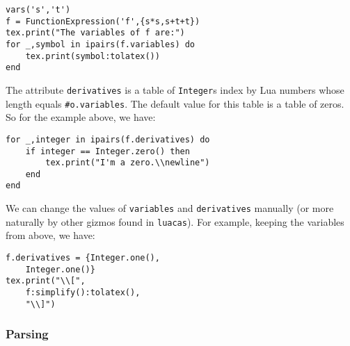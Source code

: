 \documentclass{article}
\begin{document}
\begin{codebox}
    \begin{verbatim}
vars('s','t')
f = FunctionExpression('f',{s*s,s+t+t})
tex.print("The variables of f are:")
for _,symbol in ipairs(f.variables) do 
    tex.print(symbol:tolatex())
end
    \end{verbatim}
    \tcblower
{}
\end{codebox}
The attribute \texttt{derivatives} is a table of \texttt{Integer}s index by Lua numbers whose length equals \texttt{#o.variables}. The default value for this table is a table of zeros. So for the example above, we have:
\begin{codebox}
    \begin{verbatim}
for _,integer in ipairs(f.derivatives) do 
    if integer == Integer.zero() then
        tex.print("I'm a zero.\\newline")
    end
end
\end{verbatim}
\tcblower
{}
\end{codebox}
We can change the values of \texttt{variables} and \texttt{derivatives} manually (or more naturally by other gizmos found in \texttt{luacas}). For example, keeping the variables from above, we have:
\begin{codebox}
    \begin{verbatim}
f.derivatives = {Integer.one(),
    Integer.one()}
tex.print("\\[",
    f:simplify():tolatex(),
    "\\]")
\end{verbatim}
\tcblower
{}
\end{codebox}

\subsubsection*{Parsing}
\end{document}

